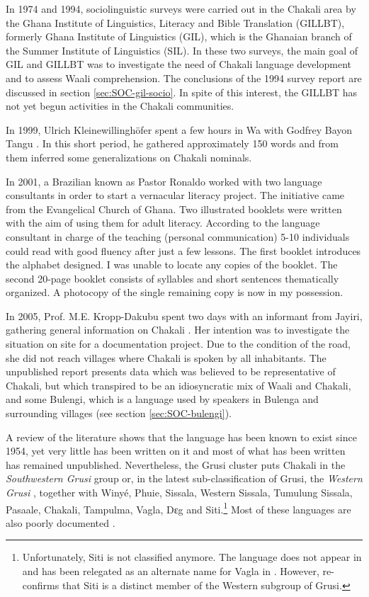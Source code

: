 In 1974 and 1994, sociolinguistic surveys were carried out in the Chakali area
by the Ghana Institute of Linguistics, Literacy and Bible Translation (GILLBT),
formerly Ghana Institute of Linguistics (GIL), which is the Ghanaian branch of
the Summer Institute of Linguistics (SIL). In these two surveys, the main goal
of GIL and GILLBT  was to investigate the need of Chakali language development
and to assess  Waali comprehension. The conclusions of the 1994 survey report
are discussed in section \ref{sec:SOC-gil-socio}. In spite of this interest, the
GILLBT has not yet begun activities in the Chakali communities. 

In 1999, Ulrich Kleinewillinghöfer spent a few hours in Wa with Godfrey Bayon
Tangu \citep{Klei99}. In this short period,  he  gathered 
approximately 150 words  and from them  inferred some generalizations on Chakali
nominals.

In 2001, a Brazilian  known as Pastor Ronaldo worked with two  language
consultants in order to start a vernacular literacy project. The initiative came
from the Evangelical Church of Ghana.  Two illustrated booklets were written
with  the aim of using them for adult literacy. According to the language
consultant in charge of the teaching (personal communication) 5-10 individuals
could  read with good fluency after just a few lessons. The first booklet
introduces the alphabet designed. I was unable to locate any copies of the 
booklet.  The second 20-page booklet consists of  syllables and short sentences
thematically organized.  A photocopy of the single remaining copy is now in my
possession. 

In 2005, Prof. M.E. Kropp-Dakubu spent two  days with an informant from Jayiri,
gathering general information on Chakali  \citep{Daku05}. Her intention was to
investigate the situation on site for a documentation project. Due to the
condition of the road, she did not reach villages where Chakali is spoken by all
inhabitants. The unpublished report  presents  data which was believed to be
representative of  Chakali, but which transpired to be an idiosyncratic mix of
Waali and Chakali, and some Bulengi, which is a language used by speakers in
Bulenga and surrounding villages (see section  \ref{sec:SOC-bulengi}). 


A review of the  literature shows that  the language has been known to exist
since 1954, yet very little has been written on  it and  most of what has
been written has remained unpublished.  Nevertheless, the Grusi cluster puts
Chakali in the  {\it Southwestern Grusi} group \citep{Nade89} or,  in the latest
sub-classification of Grusi,  the {\it Western Grusi} \citep{Lewi09}, together
with Winyé, Phuie, Sissala, Western Sissala, Tumulung Sissala, Pasaale, Chakali,
Tampulma, Vagla, Dɛg and Siti.\footnote{Unfortunately, Siti is not classified
anymore. The language does not appear in \cite{Nade89} and has been relegated as
an alternate name for Vagla in \cite{Lewi09}. However, \cite{Klei99b}
re-confirms that Siti is a distinct member of the
 Western subgroup of Grusi.} Most of these languages are also poorly documented
\cite[see][]{Klei97}. 

